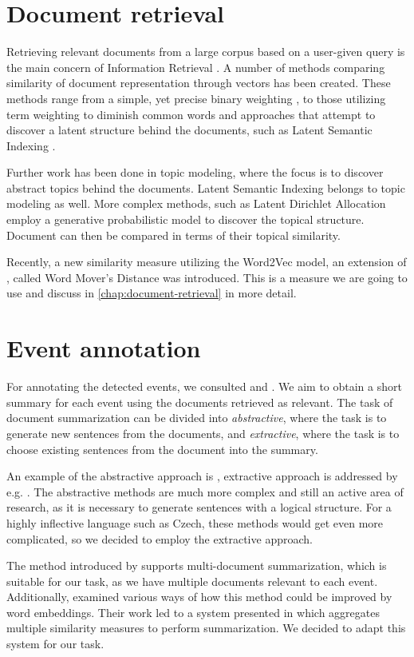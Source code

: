\section{Document retrieval}
Retrieving relevant documents from a large corpus based on a user-given query is the main concern of Information Retrieval \citep{information-retrieval-2, information-retrieval}. A number of methods comparing similarity of document representation through vectors has been created. These methods range from a simple, yet precise binary weighting \citep{luhn, salton, information-retrieval}, to those utilizing term weighting to diminish common words \citep{tfidf} and approaches that attempt to discover a latent structure behind the documents, such as Latent Semantic Indexing \citep{lsi}.

Further work has been done in topic modeling, where the focus is to discover abstract topics behind the documents. Latent Semantic Indexing belongs to topic modeling as well. More complex methods, such as Latent Dirichlet Allocation \citep{lda} employ a generative probabilistic model to discover the topical structure. Document can then be compared in terms of their topical similarity.

Recently, a new similarity measure utilizing the Word2Vec model, an extension of \cite{emd}, called Word Mover's Distance \citep{wmd} was introduced. This is a measure we are going to use and discuss in \autoref{chap:document-retrieval} in more detail.

\section{Event annotation}
For annotating the detected events, we consulted \cite{summarization-survey-1} and \cite{summarization-survey-2}. We aim to obtain a short summary for each event using the documents retrieved as relevant. The task of document summarization can be divided into \textit{abstractive}, where the task is to generate new sentences from the documents, and \textit{extractive}, where the task is to choose existing sentences from the document into the summary.

An example of the abstractive approach is \cite{heady}, extractive approach is addressed by e.g. \cite{sum-multi, multi-summarization-1, multi-summarization-2}. The abstractive methods are much more complex and still an active area of research, as it is necessary to generate sentences with a logical structure. For a highly inflective language such as Czech, these methods would get even more complicated, so we decided to employ the extractive approach.

The method introduced by \cite{multi-summarization-1, multi-summarization-2} supports multi-document summarization, which is suitable for our task, as we have multiple documents relevant to each event. Additionally, \cite{mogren-1} examined various ways of how this method could be improved by word embeddings. Their work led to a system presented in \cite{mogren-2} which aggregates multiple similarity measures to perform summarization. We decided to adapt this system for our task.